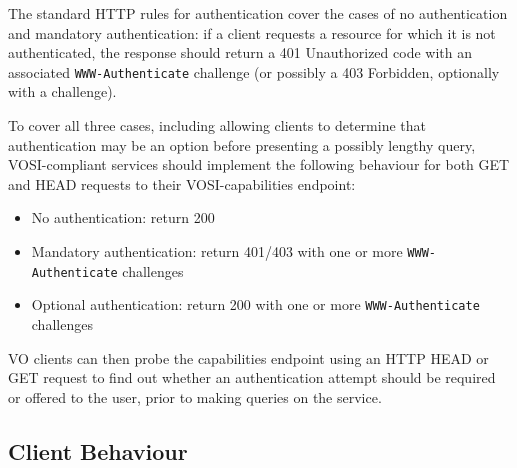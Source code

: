 \documentclass[11pt,a4paper]{ivoa}
\newcommand{\header}[1]{{\tt #1}}
\begin{document}
The standard HTTP rules for authentication cover the cases of
no authentication and mandatory authentication:
if a client requests a resource for which it is not authenticated,
the response should return a 401 Unauthorized code with an associated
\header{WWW-Authenticate} challenge
(or possibly a 403 Forbidden, optionally with a challenge).

To cover all three cases,
including allowing clients to determine that authentication may be an
option before presenting a possibly lengthy query,
VOSI-compliant services should implement the following behaviour
for both GET and HEAD requests to their VOSI-capabilities endpoint:
\begin{itemize}
  \item No authentication:
        return 200
  \item Mandatory authentication:
        return 401/403 with one or more \header{WWW-Authenticate} challenges
  \item Optional authentication:
        return 200 with one or more \header{WWW-Authenticate} challenges
\end{itemize}
VO clients can then probe the capabilities endpoint using an HTTP HEAD
or GET request to find out whether an authentication attempt should be
required or offered to the user, prior to making queries on the service.

\subsection{Client Behaviour}
\end{document}
